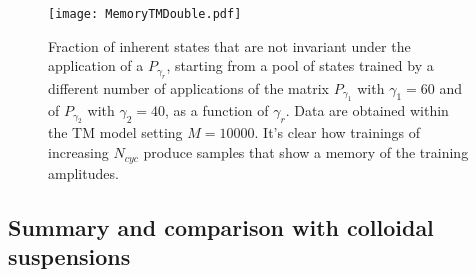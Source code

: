 \begin{figure} 
\centering 
\texttt{[image: MemoryTMDouble.pdf]} 
\caption{Fraction of inherent states that are not invariant under the application of a $P_{\gamma_{r}}$, starting from a pool of states trained by a different number of applications of the matrix $P_{\gamma_{1}}$ with $\gamma_{1} = 60$ and of $P_{\gamma_{2}}$ with $\gamma_{2} = 40$, as a function of $\gamma_{r}$. Data are obtained within the TM model setting $M=10000$. It's clear how trainings of increasing $N_{cyc}$ produce samples that show a memory of the training amplitudes. \label{fig:DoubleMemoryTM}}
\end{figure}

\subsection{Summary and comparison with colloidal suspensions}

